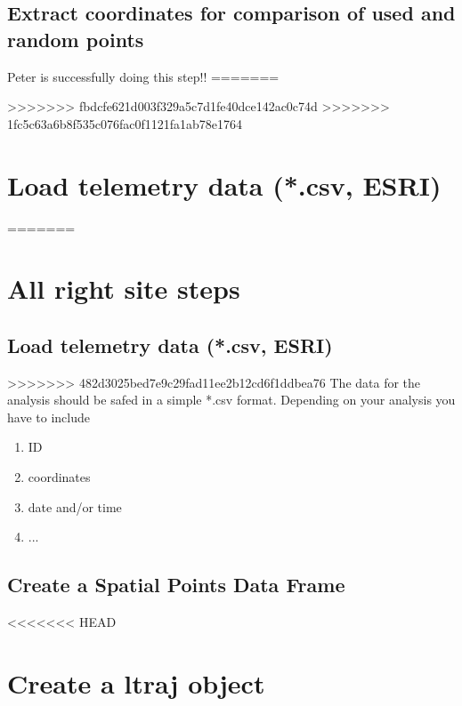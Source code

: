 \documentclass[11pt, a4paper]{article} %
\begin{document}
\subsection{Extract coordinates for comparison of used and random points} %
Peter is successfully doing this step!!
=======


>>>>>>> fbdcfe621d003f329a5c7d1fe40dce142ac0c74d
>>>>>>> 1fc5c63a6b8f535c076fac0f1121fa1ab78e1764

\section{Load telemetry data (*.csv, ESRI)}%
=======
\section{All right site steps}

\subsection{Load telemetry data (*.csv, ESRI)}%
>>>>>>> 482d3025bed7e9c29fad11ee2b12cd6f1ddbea76
The data for the analysis should be safed in a simple *.csv format. Depending on your analysis you have to include 
\begin{enumerate}
\item{ID}
\item{coordinates}
\item{date and/or time}
\item{...}
\end{enumerate}



\subsection{Create a Spatial Points Data Frame}%

<<<<<<< HEAD
\section{Create a ltraj object}%
\end{document}
